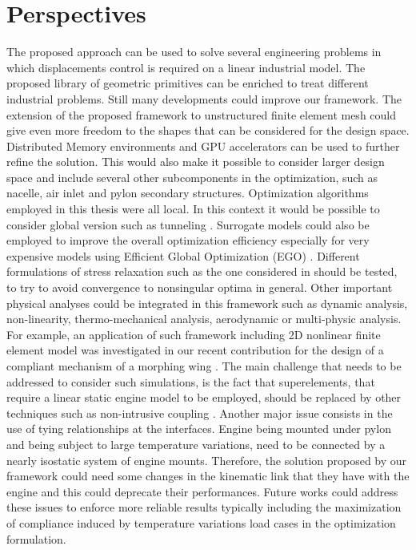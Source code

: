 \section{Perspectives}
The proposed approach can be used to solve several engineering problems in which displacements control is required on a linear industrial model. The proposed library of geometric primitives can be enriched to treat different industrial problems. Still many developments could improve our framework. 
The extension of the proposed framework to unstructured finite element mesh could give even more freedom to the shapes that can be considered for the design space.
Distributed Memory environments and GPU accelerators can be used to further refine the solution. This would also make it possible to consider larger design space and include several other subcomponents in the optimization, such as nacelle, air inlet and pylon secondary structures.
Optimization algorithms employed in this thesis were all local. In this context it would be possible to consider global version such as tunneling \cite{zhang2018finding}.
Surrogate models could also be employed to improve the overall optimization efficiency especially for very expensive models using Efficient Global Optimization (EGO) \cite{bouhlel2018efficient}.
Different formulations of stress relaxation such as the one considered in \cite{zhang2017stress} should be tested, to try to avoid convergence to nonsingular optima in general.
Other important physical analyses could be integrated in this framework such as dynamic analysis, non-linearity, thermo-mechanical analysis, aerodynamic or multi-physic analysis. For example, an application of such framework including 2D nonlinear finite element model was investigated in our recent contribution for the design of a compliant mechanism of a morphing wing \cite{capasso2019optimisation}.
The main challenge that needs to be addressed to consider such simulations, is the fact that superelements, that require a linear static engine model to be employed, should be replaced by other techniques such as non-intrusive coupling \cite{Gendre2009}. Another major issue consists in the use of tying relationships at the interfaces. Engine being mounted under pylon and being subject to large temperature variations, need to be connected by a nearly isostatic system of engine mounts. Therefore, the solution proposed by our framework could need some changes in the kinematic link that they have with the engine and this could deprecate their performances. Future works could address these issues to enforce more reliable results typically including the maximization of compliance induced by temperature variations load cases in the optimization formulation. 
